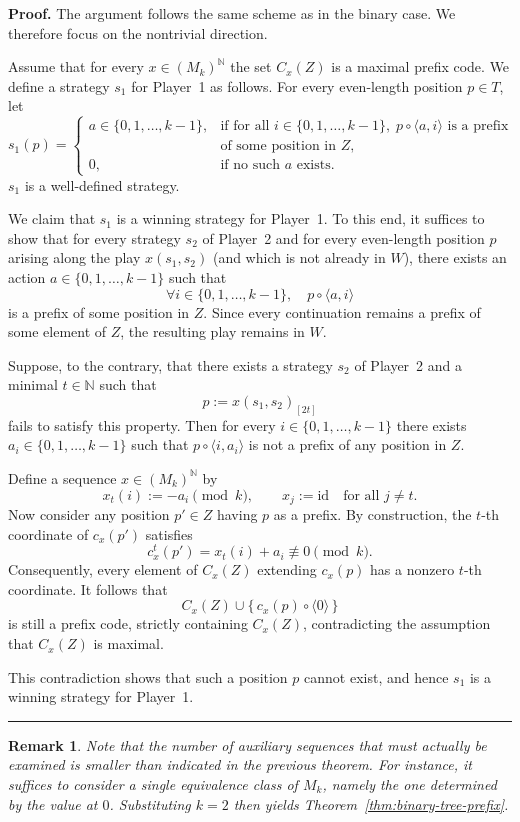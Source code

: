 \documentclass[a4,12pt]{article}%
\newtheorem{remark}[theorem]{Remark}
\newenvironment{proof}[1][Proof]{\textbf{#1.} }{\ \rule{0.5em}{0.5em}}
\begin{document}
\begin{proof}
The argument follows the same scheme as in the binary case. We therefore
focus on the nontrivial direction.

Assume that for every $x \in (M_k)^{\mathbb{N}}$ the set $C_x(Z)$ is a maximal
prefix code. We define a strategy $s_1$ for Player~1 as follows. For every
even-length position $p \in T$, let
\[
s_1(p) =
\begin{cases}
a \in \{0,1,\dots,k-1\}, & \text{if for all } i \in \{0,1,\dots,k-1\},\;
p \circ \langle a,i\rangle \text{ is a prefix} \\
& \text{of some position in } Z, \\
0, & \text{if no such } a \text{ exists}.
\end{cases}
\]
$s_1$ is a well-defined strategy.

We claim that $s_1$ is a winning strategy for Player~1. To this end, it
suffices to show that for every strategy $s_2$ of Player~2 and for every
even-length position $p$ arising along the play $x(s_1,s_2)$ (and which is not already in $W$), there exists
an action $a \in \{0,1,\dots,k-1\}$ such that
\[
\forall i \in \{0,1,\dots,k-1\}, \quad
p \circ \langle a,i\rangle
\]
is a prefix of some position in $Z$. Since every continuation remains a prefix of some element of $Z$, the resulting play remains in $W$.

Suppose, to the contrary, that there exists a strategy $s_2$ of
Player~2 and a minimal $t \in \mathbb{N}$ such that
\[
p := x(s_1,s_2)_{[2t]}
\]
fails to satisfy this property. Then for every $i \in \{0,1,\dots,k-1\}$
there exists $a_i \in \{0,1,\dots,k-1\}$ such that
$p \circ \langle i,a_i\rangle$ is not a prefix of any position in $Z$.

Define a sequence $x \in (M_k)^{\mathbb{N}}$ by
\[
x_t(i) := -a_i \pmod{k},
\qquad
x_j := \mathrm{id} \quad \text{for all } j \neq t.
\]
Now consider any position $p' \in Z$ having $p$ as a prefix. By construction,
the $t$-th coordinate of $c_x(p')$ satisfies
\[
c_x^t(p') = x_t(i) + a_i \not\equiv 0 \pmod{k}.
\]
Consequently, every element of $C_x(Z)$ extending $c_x(p)$ has a nonzero
$t$-th coordinate. It follows that
\[
C_x(Z) \cup \{\, c_x(p) \circ \langle 0 \rangle \,\}
\]
is still a prefix code, strictly containing $C_x(Z)$, contradicting the
assumption that $C_x(Z)$ is maximal.

This contradiction shows that such a position $p$ cannot exist, and hence
$s_1$ is a winning strategy for Player~1.
\end{proof}
\begin{remark}
    Note that the number of auxiliary sequences that must actually be examined is smaller than indicated in the previous theorem. For instance, it suffices to consider a single equivalence class of $M_k$, namely the one determined by the value at $0$. Substituting $k=2$ then yields Theorem~\ref{thm:binary-tree-prefix}.
\end{remark}
\end{document}
